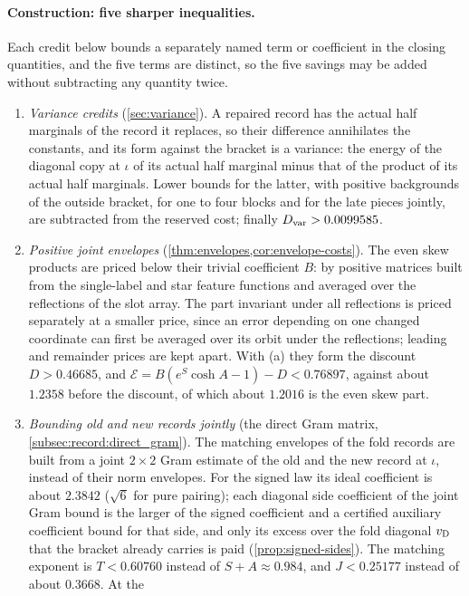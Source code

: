 \paragraph{Construction: five sharper inequalities.}
Each credit below bounds a separately named term or coefficient
in the closing quantities, and the five terms are distinct, so
the five savings may be added without subtracting any quantity
twice.
\begin{enumerate}[label=(\alph*)]
\item \emph{Variance credits} (\cref{sec:variance}). A repaired record has the
 actual half marginals of the record it replaces, so their difference
 annihilates the constants, and its form against the bracket is a variance:
 the energy of the diagonal copy at $\iota$ of its actual half
 marginal minus that of the product of its actual
 half marginals. Lower bounds for the latter, with positive backgrounds of the
 outside bracket, for one to four blocks and for the late pieces jointly,
 are subtracted from the reserved cost; finally $D_{\rm var}>0.0099585$.
\item \emph{Positive joint envelopes} (\cref{thm:envelopes,cor:envelope-costs}).
 The even skew products are priced below their trivial coefficient $B$: by
 positive matrices built from the single-label and star feature
 functions and averaged over the reflections of the slot array.
 The part invariant under all reflections is priced separately at
 a smaller price, since an error depending on one changed
 coordinate can first be averaged over its orbit under the
 reflections; leading and remainder prices are kept apart. With (a)
 they form the discount $D>0.46685$, and
 $\mathcal E=B(e^S\cosh A-1)-D<0.76897$, against about $1.2358$ before the
 discount, of which about $1.2016$ is the even skew part.
\item \emph{Bounding old and new records jointly} (the direct Gram
 matrix, \cref{subsec:record:direct_gram}). The matching
 envelopes of the fold records are built from a joint $2\times2$ Gram
 estimate of the old and the new record at $\iota$, instead of their norm
 envelopes. For the signed law its ideal coefficient is about $2.3842$
 ($\sqrt6$ for pure pairing); each diagonal side coefficient of the joint
 Gram bound is the larger of the signed coefficient and a
 certified auxiliary coefficient bound for that side, and only its excess over the fold diagonal
 $v_{\rm D}$ that the bracket already carries is paid
 (\cref{prop:signed-sides}). The matching exponent is $T<0.60760$ instead of
 $S+A\approx0.984$, and $J<0.25177$ instead of about $0.3668$. At the

\end{enumerate}
